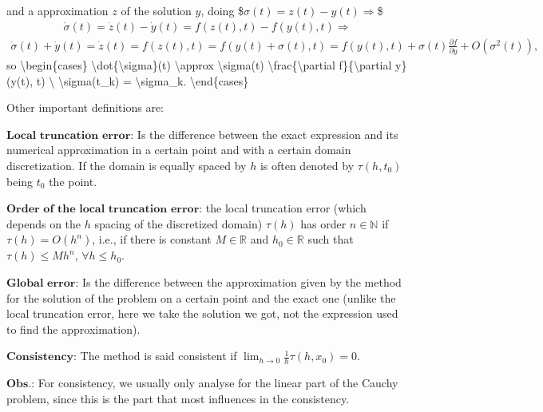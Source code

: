 \documentclass[letterpaper,10pt,english]{jupyterBook}
\begin{document}
\sphinxAtStartPar
and a approximation \(z\) of the solution \(y\), doing
\$\(
\sigma(t) = z(t) - y(t) \Rightarrow
\)\$
\begin{equation*}
\begin{split}
\dot{\sigma}(t) = \dot{z}(t) - \dot{y}(t) = f(z(t), t) - f(y(t), t) \Rightarrow
\end{split}
\end{equation*}\begin{equation*}
\begin{split}
\dot{\sigma}(t) + \dot{y}(t) = \dot{z}(t) = f(z(t), t) = f(y(t)+\sigma(t), t) = f(y(t), t) + \sigma(t)\frac{\partial f}{\partial y} + O(\sigma^2(t)),
\end{split}
\end{equation*}
\sphinxAtStartPar
so
\textbackslash{}begin\{cases\}
\textbackslash{}dot\{\textbackslash{}sigma\}(t) \textbackslash{}approx \textbackslash{}sigma(t) \textbackslash{}frac\{\textbackslash{}partial f\}\{\textbackslash{}partial y\} (y(t), t) \textbackslash{}
\textbackslash{}sigma(t\_k) = \textbackslash{}sigma\_k.
\textbackslash{}end\{cases\}

\sphinxAtStartPar
Other important definitions are:

\sphinxAtStartPar
\(\textbf{Local truncation error:}\) Is the difference between the exact expression and its numerical approximation in a certain point and with a certain domain discretization. If the domain is equally spaced by \(h\) is often denoted by \(\tau(h,t_0)\) being \(t_0\) the point.

\sphinxAtStartPar
\(\textbf{Order of the local truncation error:}\) the local truncation error (which depends on the \(h\) spacing of the discretized domain) \(\tau(h)\) has order \(n \in \mathbb{N}\) if \(\tau(h) = O(h^n) \), i.e., if there is constant \(M \in \mathbb{R}\) and \(h_0 \in \mathbb{R}\) such that \(\tau(h) \leq M h^n\), \(\forall h \leq h_0\).

\sphinxAtStartPar
\(\textbf{Global error:}\) Is the difference between the approximation given by the method for the solution of the problem on a certain point and the exact one (unlike the local truncation error, here we take the solution we got, not the expression used to find the approximation).

\sphinxAtStartPar
\(\textbf{Consistency:}\) The method is said consistent if \(\lim _{h \to 0} \frac{1}{h}\tau(h,x_0) = 0\).

\sphinxAtStartPar
\(\textbf{Obs.:}\) For consistency, we usually only analyse for the linear part of the Cauchy problem, since this is the part that most influences in the consistency.
\end{document}
